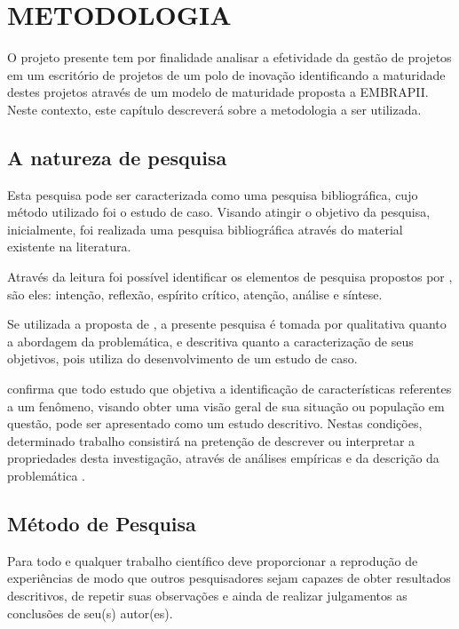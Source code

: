 \chapter{METODOLOGIA}
\thispagestyle{empty}

O projeto presente tem por finalidade analisar a efetividade da gestão de projetos em um escritório de projetos de um polo de inovação identificando a maturidade destes projetos através de um modelo de maturidade proposta a EMBRAPII. Neste contexto, este capítulo descreverá sobre a metodologia a ser utilizada.


\section{A natureza de pesquisa}

Esta pesquisa pode ser caracterizada como uma pesquisa bibliográfica, cujo método utilizado foi o estudo de caso. Visando atingir o objetivo da pesquisa, inicialmente, foi realizada uma pesquisa bibliográfica através do material existente na literatura.

Através da leitura foi possível identificar os elementos de pesquisa propostos por , são eles: intenção, reflexão, espírito crítico, atenção, análise e síntese.

Se utilizada a proposta de , a presente pesquisa é tomada por qualitativa quanto a abordagem da problemática, e descritiva quanto a caracterização de seus objetivos, pois utiliza do desenvolvimento de um estudo de caso.

 confirma que todo estudo que objetiva a identificação de características referentes a um fenômeno, visando obter uma visão geral de sua situação ou população em questão, pode ser apresentado como um estudo descritivo. Nestas condições, determinado trabalho consistirá na pretenção de descrever ou interpretar a propriedades desta investigação, através de análises empíricas e da descrição da problemática \cite{fortin2009fundamentos, lakatos2010fundamentos}.

\section{Método de Pesquisa}

Para  todo e qualquer trabalho científico deve proporcionar a reprodução de experiências de modo que outros pesquisadores sejam capazes de obter resultados descritivos, de repetir suas observações e ainda de realizar julgamentos as conclusões de seu(s) autor(es).

